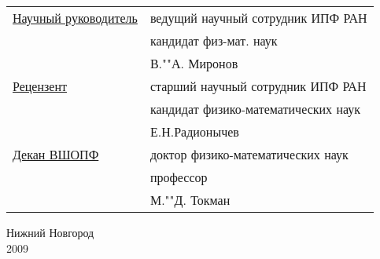{%
\noindent\begin{tabular}{@{}p{}@{}>{\hfill}p{}@{}}
\underline{Научный руководитель}&\hfill ведущий научный сотрудник ИПФ РАН\\
&\hfill кандидат физ-мат. наук\\[0.3cm]
&\underline{\hspace{3cm}} В.""А. Миронов\\[1.2cm]

\underline{Рецензент}&\hfill старший научный сотрудник ИПФ РАН\\
&\hfill кандидат физико-математических наук\\[0.3cm]
&\underline{\hspace{3cm}} Е.Н.Радионычев\\[1.2cm]

\underline{Декан ВШОПФ}&доктор физико-математических наук\\
&профессор\\[0.3cm]
&\underline{\hspace{3cm}} М.""Д. Токман
\end{tabular}

\vfill
\begin{center}
Нижний Новгород\\
2009
\end{center}
}%
\eject
